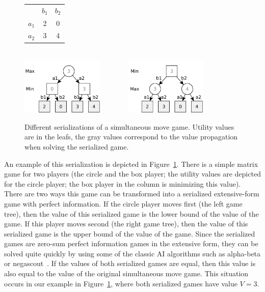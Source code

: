 \begin{figure}
\centering
\begin{tabular}{l|c|c|}
 \multicolumn{1}{c}{~} & \multicolumn{1}{c}{$b_1$}  &  \multicolumn{1}{c}{$b_2$}\\\cline{2-3}
$a_1$ &  2  &  0\\\cline{2-3}
$a_2$ &  3  &  4\\\cline{2-3}
\end{tabular}
\\\vspace{0.5cm}
\includegraphics[width=0.35\textwidth]{figures/serialization1.pdf}~~~~~~~
\includegraphics[width=0.35\textwidth]{figures/serialization2.pdf}
\caption{Different serializations of a simultaneous move game. Utility values are in the leafs, the gray values correspond to the value propagation when solving the serialized game.}\label{fig:serialization}
\end{figure}

An example of this serialization is depicted in Figure~\ref{fig:serialization}.
There is a simple matrix game for two players (the circle and the box player; the utility values are depicted for the circle player; the box player in the column is minimizing this value).
There are two ways this game can be transformed into a serialized extensive-form game with perfect information.
If the circle player moves first (the left game tree), then the value of this serialized game is the lower bound of the value of the game. If this player moves second (the right game tree), then the value of this serialized game is the upper bound of the value of the game.
Since the serialized games are zero-sum perfect information games in the extensive form, they can be solved quite quickly by using some of the classic AI
algorithms such as alpha-beta or negascout~\cite{Negascout}.
If the values of both serialized games are equal, then this value is also equal to the value of the original simultaneous move game.
This situation occurs in our example in Figure~\ref{fig:serialization}, where both serialized games have value $V = 3$.

